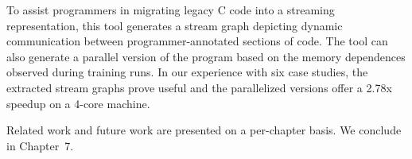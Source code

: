   To
  assist programmers in migrating legacy C code into a streaming
  representation, this tool generates a stream graph depicting dynamic
  communication between programmer-annotated sections of code.  The
  tool can also generate a parallel version of the program based on
  the memory dependences observed during training runs.  In our
  experience with six case studies, the extracted stream graphs prove
  useful and the parallelized versions offer a 2.78x speedup on a
  4-core machine.

\myend


\noindent Related work and future work are presented on a per-chapter 
basis.  We conclude in Chapter~7.
